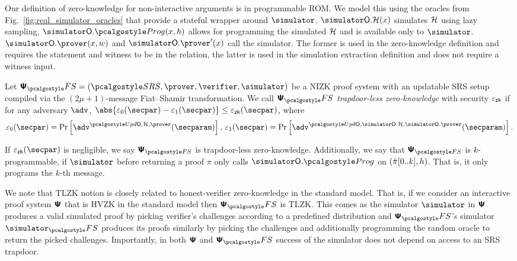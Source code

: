  Our definition of zero-knowledge for non-interactive
arguments is in programmable ROM.
We model this using the oracles from Fig.~\ref{fig:real_simulator_oracles} that provide a stateful wrapper around $\simulator$.
$\simOH (x)$ simulates $\mathcal{H}$ using lazy sampling, $\simulator\oracleo.\prog(x, h)$ allows for programming the simulated $\mathcal{H}$ and is available only to $\simulator$. $\simOP(x, w)$ and $\simOP'(x)$ call the simulator. The former is used in the zero-knowledge definition and requires the statement and witness to be in the relation, the latter is used in the simulation extraction definition and does not require a witness input.

\begin{definition}
  \label{def:TLZK}
  Let 
  $\psfs = (\SRScer, \prover, \verifier, \simulator)$ be a NIZK proof system with an updatable SRS setup compiled via the $(2\mu + 1)$-message Fiat--Shamir transformation. %
  We call $\psfs$ \emph{trapdoor-less zero-knowledge} with security $\varepsilon_{\mathsf{zk}}$ if for any
  adversary $\adv$, $\abs{\eps_0(\secpar) - \eps_1(\secpar)} \leq \epszk(\secpar)$, where
  \begin{align*}
    \eps_0 (\secpar) = \Pr\left[ \adv^{\initU, \ro, \prover} (\secparam) \right],\,
    \eps_1 (\secpar)=  \Pr \left[\adv^{\initU, \simOH, \simOP} (\secparam) \right].
  \end{align*}
  
  If $\epszk(\secpar)$ is negligible, we say $\ps_{\fs}$ is trapdoor-less zero-knowledge. Additionally, we say that $\ps_{\fs}$ is $k$-programmable, if  $\simulator$ before returning a proof $\pi$ only calls $\simulator\oracleo.\prog$ on $(\tilde{\pi}[0..k],h)$. That is, it only programs the $k$-th message.
  \end{definition}

  
\begin{remark}
  We note that TLZK notion is closely related to honest-verifier zero-knowledge in the
  standard model. That is, if we consider an interactive proof system $\bm{\mathsf{\Psi}}$
  that is HVZK in the standard model then $\proofsystem_\fs$ is TLZK. This comes as the simulator $\simulator$ in
  $\bm{\mathsf{\Psi}}$ produces a valid simulated proof by picking verifier's challenges
  according to a predefined distribution and $\proofsystem_\fs$'s simulator
  $\simulator_\fs$ produces its proofs similarly by picking the challenges and
  additionally programming the random oracle to return the picked
  challenges. Importantly, in both $\bm{\mathsf{\Psi}}$ and $\proofsystem_\fs$ success of
  the simulator does not depend on access to an SRS trapdoor.
\end{remark}

